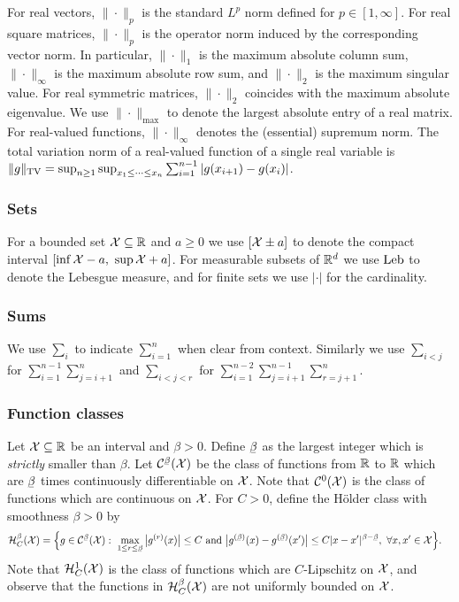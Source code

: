 For real vectors,
$\|\cdot\|_p$ is the standard $L^p$
norm defined for $p \in [1, \infty]$.
For real square matrices,
$\|\cdot\|_p$ is the operator
norm induced by the corresponding vector norm.
In particular,
$\|\cdot\|_1$
is the maximum absolute column sum,
$\|\cdot\|_\infty$
is the maximum absolute row sum,
and
$\|\cdot\|_2$
is the maximum singular value.
For real symmetric matrices,
$\|\cdot\|_2$
coincides with the maximum absolute eigenvalue.
We use $\|\cdot\|_{\max}$
to denote the largest absolute entry of a real matrix.
For real-valued functions,
$\|\cdot\|_\infty$
denotes the (essential) supremum norm.
The total variation norm of a
real-valued function of a single real variable is
$\|g\|_{\mathrm{TV}} = \sup_{n \geq 1} \sup_{x_1 \leq \cdots \leq x_n}
\sum_{i=1}^{n-1} |g(x_{i+1}) - g(x_i)|$.

\subsubsection{Sets}

For a bounded set $\mathcal{X} \subseteq \mathbb{R}$ and $a \geq 0$
we use $[\mathcal{X} \pm a]$ to denote the compact interval
$[\inf \mathcal{X} - a, \ \sup \mathcal{X} + a]$.
For measurable subsets of $\mathbb{R}^d$
we use $\operatorname{Leb}$ to denote the Lebesgue measure,
and for finite sets we use $|\cdot|$
for the cardinality.

\subsubsection{Sums}

We use $\sum_i$
to indicate $\sum_{i=1}^n$
when clear from context.
Similarly we use $\sum_{i<j}$
for $\sum_{i=1}^{n-1} \sum_{j=i+1}^n$
and $\sum_{i<j<r}$
for $\sum_{i=1}^{n-2} \sum_{j=i+1}^{n-1} \sum_{r=j+1}^n$.

\subsubsection{Function classes}

Let $\mathcal{X} \subseteq \mathbb{R}$ be an interval and $\beta > 0$.
Define $\flbeta$ as the largest integer
which is \emph{strictly} smaller than $\beta$.
Let $\cC^{\flbeta}(\cX)$ be the class
of functions from $\mathbb{R}$ to $\mathbb{R}$ which are
$\flbeta$ times continuously differentiable on $\mathcal{X}$.
Note that $\mathcal{C}^0(\mathcal{X})$ is the class of functions
which are continuous on $\mathcal{X}$.
For $C > 0$, define the H\"older class with smoothness
$\beta > 0$ by
%
\begin{align*}
  \cH^\beta_C(\cX)
  &=
  \Big\{
  g \in \cC^{\flbeta}(\cX): \
  \max_{1 \leq r \leq \flbeta}
  \big| g^{(r)}(x) \big| \leq C
  \text{ and }
  \big| g^{(\flbeta)}(x) - g^{(\flbeta)}(x') \big|
  \leq C |x-x'|^{\beta - \flbeta}, \
  \forall
  x, x' \in \cX
  \Big\}.
\end{align*}
%
Note that $\mathcal{H}^1_C(\mathcal{X})$
is the class of functions which are $C$-Lipschitz on $\mathcal{X}$,
and observe that the functions in
$\mathcal{H}^\beta_C(\mathcal{X})$ are not uniformly bounded on $\mathcal{X}$.

